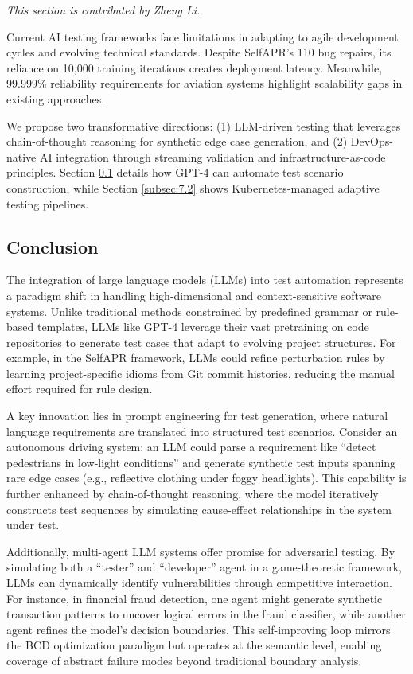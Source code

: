 \documentclass[manuscript,screen,review]{acmart}
\begin{document}
\textit{This section is contributed by Zheng Li.}

Current AI testing frameworks face limitations in adapting to agile development cycles and evolving technical standards. Despite SelfAPR's 110 bug repairs, its reliance on 10,000 training iterations creates deployment latency. Meanwhile, 99.999\% reliability requirements for aviation systems highlight scalability gaps in existing approaches.

We propose two transformative directions: (1) LLM-driven testing that leverages chain-of-thought reasoning for synthetic edge case generation, and (2) DevOps-native AI integration through streaming validation and infrastructure-as-code principles. Section \ref{subsec:7.1} details how GPT-4 can automate test scenario construction, while Section \ref{subsec:7.2} shows Kubernetes-managed adaptive testing pipelines.

\subsection{Conclusion}
\label{subsec:7.1}

The integration of large language models (LLMs) into test automation represents a paradigm shift in handling high-dimensional and context-sensitive software systems. Unlike traditional methods constrained by predefined grammar or rule-based templates, LLMs like GPT-4 leverage their vast pretraining on code repositories to generate test cases that adapt to evolving project structures. For example, in the SelfAPR framework, LLMs could refine perturbation rules by learning project-specific idioms from Git commit histories, reducing the manual effort required for rule design.

A key innovation lies in prompt engineering for test generation, where natural language requirements are translated into structured test scenarios. Consider an autonomous driving system: an LLM could parse a requirement like ``detect pedestrians in low-light conditions'' and generate synthetic test inputs spanning rare edge cases (e.g., reflective clothing under foggy headlights). This capability is further enhanced by chain-of-thought reasoning, where the model iteratively constructs test sequences by simulating cause-effect relationships in the system under test.

Additionally, multi-agent LLM systems offer promise for adversarial testing. By simulating both a ``tester'' and ``developer'' agent in a game-theoretic framework\cite{Li2018}, LLMs can dynamically identify vulnerabilities through competitive interaction. For instance, in financial fraud detection, one agent might generate synthetic transaction patterns to uncover logical errors in the fraud classifier, while another agent refines the model’s decision boundaries. This self-improving loop mirrors the BCD optimization paradigm but operates at the semantic level, enabling coverage of abstract failure modes beyond traditional boundary analysis.
\end{document}
